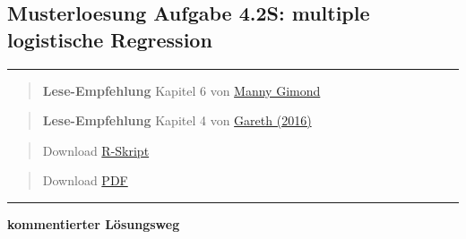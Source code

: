 \documentclass[
]{article}
\author{}
\date{\vspace{-2.5em}}
\begin{document}
\hypertarget{musterloesung-aufgabe-4.2s-multiple-logistische-regression}{%
\subsection{Musterloesung Aufgabe 4.2S: multiple logistische
Regression}\label{musterloesung-aufgabe-4.2s-multiple-logistische-regression}}

\begin{center}\rule{0.5\linewidth}{0.5pt}\end{center}

\begin{quote}
\textbf{Lese-Empfehlung} Kapitel 6 von
\href{https://mgimond.github.io/Stats-in-R/Logistic.html}{Manny Gimond}
\end{quote}

\begin{quote}
\textbf{Lese-Empfehlung} Kapitel 4 von
\href{http://faculty.marshall.usc.edu/gareth-james/ISL/ISLR\%20Seventh\%20Printing.pdf}{Gareth
(2016)}
\end{quote}

\begin{quote}
Download \href{16_Statistik/RFiles/solution_stat4.2s.R}{R-Skript}
\end{quote}

\begin{quote}
Download \href{16_Statistik1/RFiles/solution_stat4.2s.pdf}{PDF}
\end{quote}

\begin{center}\rule{0.5\linewidth}{0.5pt}\end{center}

\textbf{kommentierter Lösungsweg}
\end{document}
